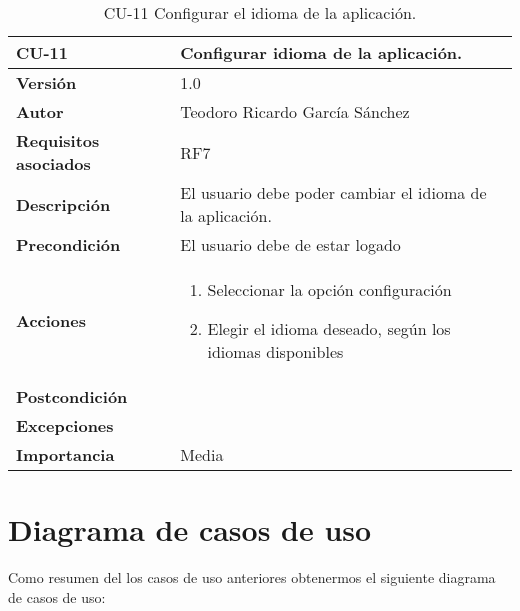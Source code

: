 \begin{table}[p]
	\centering
	\begin{tabularx}{\linewidth}{ p{} p{} }
		\toprule
		\textbf{CU-11}    & \textbf{Configurar idioma de la aplicación.}\\
		\toprule
		\textbf{Versión}              & 1.0    \\
		\textbf{Autor}                & Teodoro Ricardo García Sánchez \\
		\textbf{Requisitos asociados} & RF7 \\
		\textbf{Descripción}          & El usuario debe poder cambiar el idioma de la aplicación.  \\
		\textbf{Precondición}         & El usuario debe de estar logado \\
		\textbf{Acciones}             &
		\begin{enumerate}
			\def\labelenumi{\arabic{enumi}.}
			\tightlist
			\item Seleccionar la opción configuración
			\item Elegir el idioma deseado, según los idiomas disponibles
		\end{enumerate}\\
		\textbf{Postcondición}        &  \\
		\textbf{Excepciones}          &  \\
		\textbf{Importancia}          & Media \\
		\bottomrule
	\end{tabularx}
	\caption{CU-11 Configurar el idioma de la aplicación.}
\end{table}

\section{Diagrama de casos de uso}

Como resumen del los casos de uso anteriores obtenermos el siguiente diagrama de casos de uso:




